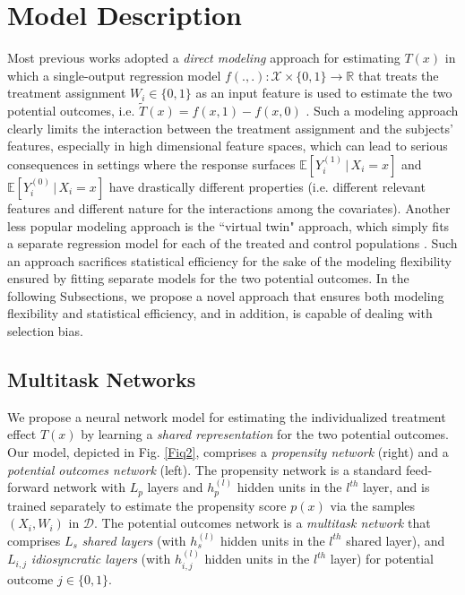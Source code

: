 \documentclass{article}
\begin{document}
\section{Model Description} 
\label{modl}
Most previous works adopted a {\it direct modeling} approach for estimating $T(x)$ in which a single-output regression model $f(.,.): \mathcal{X}\times\{0,1\}\rightarrow\mathbb{R}$ that treats the treatment assignment $W_i \in \{0,1\}$ as an input feature is used to estimate the two potential outcomes, i.e. $\tilde{T}(x) = f(x,1)-f(x,0)$ \cite{shalit2016estimating, wager2015estimation, xu2016bayesian, hill2012bayesian, johansson2016learning}. Such a modeling approach clearly limits the interaction between the treatment assignment and the subjects' features, especially in high dimensional feature spaces, which can lead to serious consequences in settings where the response surfaces $\mathbb{E}[Y^{(1)}_i\,|\,X_i = x]$ and $\mathbb{E}[Y^{(0)}_i\,|\,X_i = x]$ have drastically different properties (i.e. different relevant features and different nature for the interactions among the covariates). Another less popular modeling approach is the ``virtual twin" approach, which simply fits a separate regression model for each of the treated and control populations \cite{lu2017estimating}. Such an approach sacrifices statistical efficiency for the sake of the modeling flexibility ensured by fitting separate models for the two potential outcomes. In the following Subsections, we propose a novel approach that ensures both modeling flexibility and statistical efficiency, and in addition, is capable of dealing with selection bias.   

\subsection{Multitask Networks}
We propose a neural network model for estimating the individualized treatment effect $T(x)$ by learning a {\it shared representation} for the two potential outcomes. Our model, depicted in Fig. \ref{Fiq2}, comprises a {\it propensity network} (right) and a {\it potential outcomes network} (left). The propensity network is a standard feed-forward network with $L_p$ layers and $h_p^{(l)}$ hidden units in the $l^{th}$ layer, and is trained separately to estimate the propensity score $p(x)$ via the samples $(X_i, W_i)$ in $\mathcal{D}$. The potential outcomes network is a {\it multitask network} \cite{collobert2008unified} that comprises $L_s$ {\it shared layers} (with $h_s^{(l)}$ hidden units in the $l^{th}$ shared layer), and $L_{i,j}$ {\it idiosyncratic layers} (with $h_{i,j}^{(l)}$ hidden units in the $l^{th}$ layer) for potential outcome $j \in \{0,1\}$. 
\end{document}
